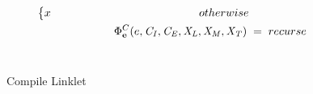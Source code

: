 \begin{figure*}[tbp]
\begin{mdframed}
\begin{align*}
\begin{cases*}
        x \hspace{4.6cm} otherwise
      \end{cases*} \\
      \Phi^C_{\textbf{e}}(e,\mathit{C_I}, \mathit{C_E}, \mathit{X_L},\mathit{X_M},\mathit{X_T})\; &=\; recurse \\
    \end{align*} \\
    \caption{Compile Linklet}
    \label{fig:compile}
  \end{mdframed}
\end{figure*}

